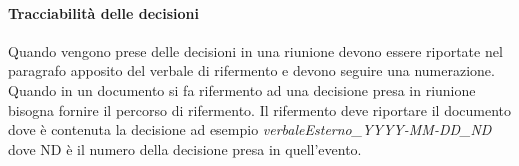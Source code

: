     \paragraph{Tracciabilità delle decisioni}
      Quando vengono prese delle decisioni in una riunione devono essere
      riportate nel paragrafo apposito del verbale di rifermento e devono
      seguire una numerazione.
      Quando in un documento si fa rifermento ad una decisione presa in riunione
      bisogna fornire il percorso di rifermento.
      Il rifermento deve riportare il documento dove è contenuta la decisione
      ad esempio \textit{verbaleEsterno\_YYYY-MM-DD\_ND} dove ND è il numero della
      decisione presa in quell'evento.
